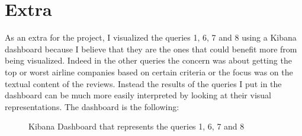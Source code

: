 \documentclass{Configuration_Files/PoliMi3i_thesis}
\begin{document}
\chapter{Extra}
As an extra for the project, I visualized the queries 1, 6, 7 and 8 using a Kibana dashboard because I believe that they are the ones that could benefit more from being visualized. Indeed in the other queries the concern was about getting the top or worst airline companies based on certain criteria or the focus was on the textual content of the reviews. Instead the results of the queries I put in the dashboard can be much more easily interpreted by looking at their visual representations.
The dashboard is the following: \\
\begin{figure}[H]
    \centering
    \caption{Kibana Dashboard that represents the queries 1, 6, 7 and 8}
\end{figure}
 
\listoffigures


\cleardoublepage
\end{document}
